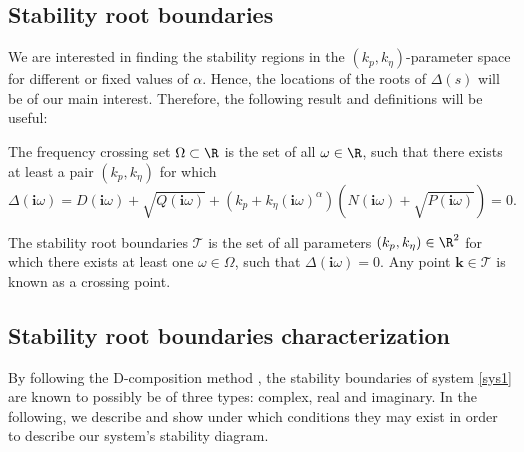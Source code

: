 \documentclass[twoside,reqno,11pt]{fcaa-var} %
\begin{document}
\subsection{Stability root boundaries}
We are interested in finding the stability regions in the $(k_p,k_\eta)$-parameter space for different or fixed values of $\alpha$. Hence, the locations of the roots of $\Delta(s)$ will be of our main interest. Therefore, the following result and definitions will be useful:
\begin{definition}
	The frequency crossing set $\Omega\subset\R$ is the set of all $\omega\in\R$, such that there exists at least a pair $(k_p,k_\eta)$ for which
	\begin{equation}
	\Delta(\bm{i}\omega)\!=\!D(\bm{i}\omega)\!+\!\sqrt{Q(\bm{i}\omega)}\!+\!(k_p\!+\!k_\eta(\bm{i}\omega)^\alpha)(N(\bm{i}\omega)\!+\!\sqrt{P(\bm{i}\omega)})\!=\!0.
	\end{equation}
\end{definition}
\begin{definition}
	The stability root boundaries $\mathcal{T}$ is the set of all parameters $(k_p,k_\eta)\in\R^2$ for which there exists at least one $\omega\in\Omega$, such that $\Delta(\bm{i}\omega)=0$. Any point $\mathbf{k}\in\mathcal{T}$ is known as a crossing point.
\end{definition}
\subsection{Stability root boundaries characterization}
By following the D-composition method \cite{gryazina2008d}, the stability boundaries of system \eqref{sys1} are known to possibly be of three types: complex, real and imaginary. In the following, we describe and show under which conditions they may exist in order to describe our system's stability diagram.
\end{document}
